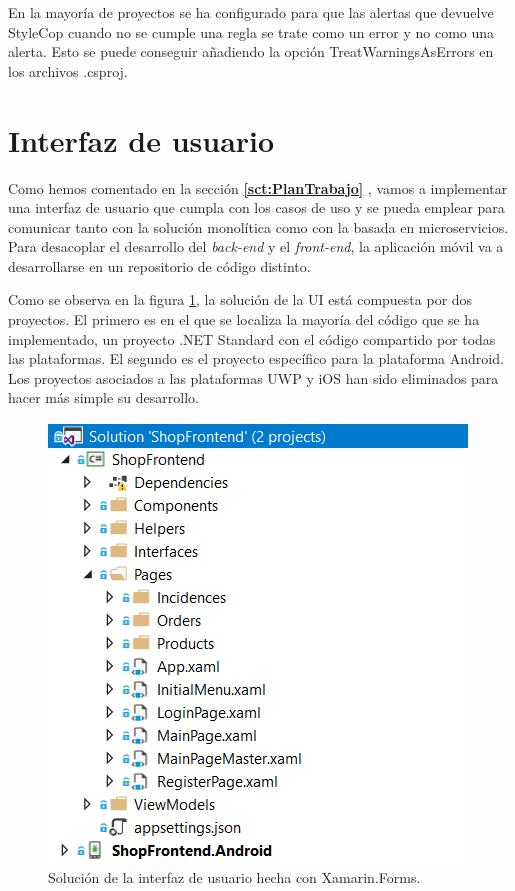 \documentclass[11pt,spanish,listoffigures]{tfgetsinf}
\begin{document}
En la mayoría de proyectos se ha configurado para que las alertas que devuelve StyleCop cuando no se cumple una regla se trate como un error y no como una alerta. Esto se puede conseguir añadiendo la opción TreatWarningsAsErrors en los archivos .csproj.

\section{Interfaz de usuario}

Como hemos comentado en la sección \textbf{\ref{sct:PlanTrabajo} }, vamos a implementar una interfaz de usuario que cumpla con los casos de uso y se pueda emplear para comunicar tanto con la solución monolítica como con la basada en microservicios. Para desacoplar el desarrollo del \textit{back-end} y el \textit{front-end}, la aplicación móvil va a desarrollarse en un repositorio de código distinto.

Como se observa en la figura \ref{fig:ShopFrontEnd}, la solución de la UI está compuesta por dos proyectos. El primero es en el que se localiza la mayoría del código que se ha implementado, un proyecto .NET Standard con el código compartido por todas las plataformas. El segundo es el proyecto específico para la plataforma Android. Los proyectos asociados a las plataformas UWP y iOS han sido eliminados para hacer más simple su desarrollo.

\begin{figure}[h]
\centering
\includegraphics[scale=0.8]{ShopFrontEnd}
\caption{Solución de la interfaz de usuario hecha con Xamarin.Forms.}
\label{fig:ShopFrontEnd}
\end{figure}
\end{document}
